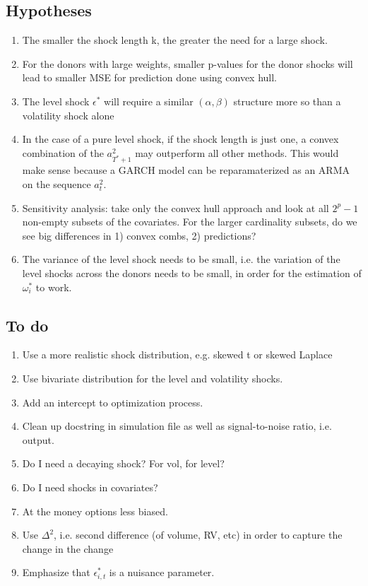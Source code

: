 \documentclass[11pt]{article}
\theoremstyle{definition}
\begin{document}
\subsection{Hypotheses}
\begin{enumerate}
\item The smaller the shock length k, the greater the need for a large shock.  
\item For the donors with large weights, smaller p-values for the donor shocks will lead to smaller MSE for prediction done using convex hull.
\item The level shock $\epsilon^{*}$ will require a similar $(\alpha, \beta)$ structure more so than a volatility shock alone
\item In the case of a pure level shock, if the shock length is just one, a convex combination of the $a^{2}_{T^{*}+1}$ may outperform all other methods.  This would make sense because a GARCH model can be reparamaterized as an ARMA on the sequence $a^{2}_{t}$.
\item Sensitivity analysis: take only the convex hull approach and look at all $2^{p }- 1$ non-empty subsets of the covariates. For the larger cardinality subsets, do we see big differences in 1) convex combs, 2) predictions?
\item The variance of the level shock needs to be small, i.e. the variation of the level shocks across the donors needs to be small, in order for the estimation of $\omega^{*}_i$ to work.
\end{enumerate}

\subsection{To do}
\begin{enumerate}
\item Use a more realistic shock distribution, e.g. skewed t or skewed Laplace
\item Use bivariate distribution for the level and volatility shocks.
\item Add an intercept to optimization process.
\item Clean up docstring in simulation file as well as signal-to-noise ratio, i.e. output.
\item Do I need a decaying shock?  For vol, for level?
\item Do I need shocks in covariates? 
\item At the money options less biased.
\item Use $\Delta^{2}$, i.e. second difference (of volume, RV, etc) in order to capture the change in the change
\item Emphasize that $\epsilon^{*}_{i,t}$ is a nuisance parameter.  
\end{enumerate}
\end{document}
